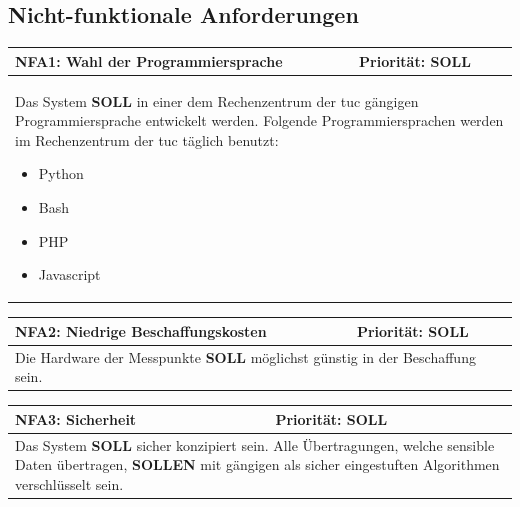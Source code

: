 \documentclass[titlepage]{report}
\begin{document}
\subsection*{Nicht-funktionale Anforderungen}
\begin{center}
\begin{tabular}{p{}>{\raggedleft\arraybackslash}p{}}\toprule
    \textbf{NFA1: Wahl der Programmiersprache} & \textbf{Priorität: SOLL} \\\midrule
	\multicolumn{2}{p{\textwidth-\tabcolsep}}{%
        Das System \textbf{SOLL} in einer dem Rechenzentrum der
        \gls{tuc} gängigen Programmiersprache entwickelt werden.
        Folgende Programmiersprachen werden im Rechenzentrum der
        \gls{tuc} täglich benutzt:
        \begin{itemize}
            \item Python
            \item Bash
            \item PHP
            \item Javascript
        \end{itemize}
    }\\\bottomrule
\end{tabular}
    \label{table:NFA1}
\end{center}
\begin{center}
\begin{tabular}{p{}>{\raggedleft\arraybackslash}p{}}\toprule
    \textbf{NFA2: Niedrige Beschaffungskosten} & \textbf{Priorität: SOLL} \\\midrule
	\multicolumn{2}{p{\textwidth-\tabcolsep}}{%
    Die Hardware der Messpunkte \textbf{SOLL} möglichst günstig in der Beschaffung
    sein.
    }\\\bottomrule
\end{tabular}
    \label{table:NFA2}
\end{center}
\begin{center}
\begin{tabular}{p{}>{\raggedleft\arraybackslash}p{}}\toprule
    \textbf{NFA3: Sicherheit} & \textbf{Priorität: SOLL} \\\midrule
	\multicolumn{2}{p{\textwidth-\tabcolsep}}{%
        Das System \textbf{SOLL} sicher konzipiert sein.
        Alle Übertragungen, welche sensible Daten übertragen,  \textbf{SOLLEN} mit gängigen
        als sicher eingestuften Algorithmen verschlüsselt sein.
        }\\\bottomrule
\end{tabular}
    \label{table:NFA3}
\end{center}
\end{document}
